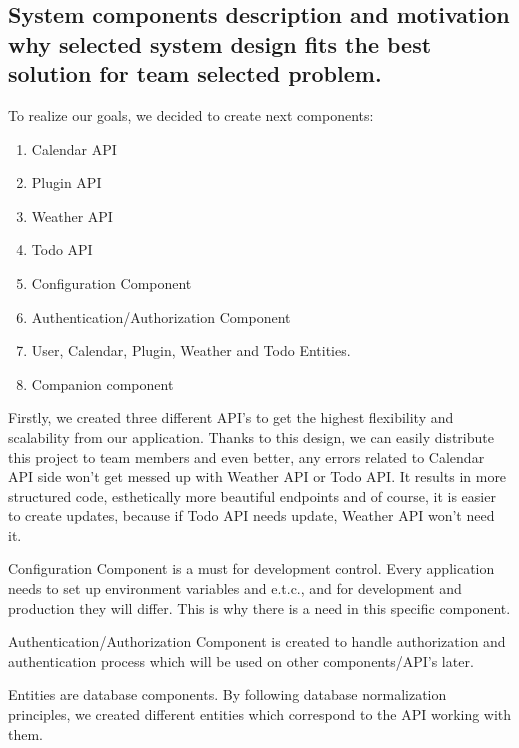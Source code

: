 \subsection {System components description and motivation why selected system design fits the best solution for team selected problem. }
\par To realize our goals, we decided to create next components: 
	\begin{enumerate}
		\item Calendar API
		\item Plugin API  
		\item Weather API  
		\item Todo API 
		\item Configuration Component 
		\item Authentication/Authorization Component 
		\item User, Calendar, Plugin, Weather and Todo Entities.
		\item Companion component  
	\end{enumerate}
\par Firstly, we created three different API’s to get the highest flexibility and scalability from our application. Thanks to this design, we can easily distribute this project to team members and even better, any errors related to Calendar API side won’t get messed up with Weather API or Todo API. It results in more structured code, esthetically more beautiful endpoints and of course, it is easier to create updates, because if Todo API needs update, Weather API won’t need it.  
\par Configuration Component is a must for development control. Every application needs to set up environment variables and e.t.c., and for development and production they will differ. This is why there is a need in this specific component. 
\par Authentication/Authorization Component is created to handle authorization and authentication process which will be used on other components/API’s later.  
\par Entities are database components. By following database normalization principles, we created different entities which correspond to the API working with them. 



